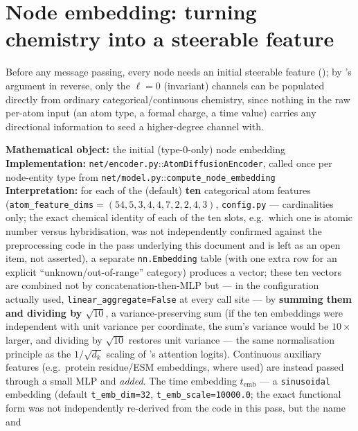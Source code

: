 \documentclass[11pt,a4paper]{report}
\theoremstyle{definition}
\theoremstyle{remark}
\newcommand{\file}[1]{\texttt{#1}}
\newcommand{\pyfunc}[1]{\texttt{#1}}
\begin{document}
\section{Node embedding: turning chemistry into a steerable feature}
\label{sec:node-embedding}

Before any message passing, every node needs an initial steerable feature
(); by 's
argument in reverse, only the $\ell=0$ (invariant) channels can be
populated directly from ordinary categorical/continuous chemistry, since
nothing in the raw per-atom input (an atom type, a formal charge, a time
value) carries any directional information to seed a higher-degree channel
with.

\begin{codebox}
\textbf{Mathematical object:} the initial (type-$0$-only) node embedding \\
\textbf{Implementation:} \file{net/encoder.py}::\pyfunc{AtomDiffusionEncoder},
called once per node-entity type from \file{net/model.py}::\pyfunc{compute\_node\_embedding} \\
\textbf{Interpretation:} for each of the (default) \textbf{ten} categorical
atom features (\texttt{atom\_feature\_dims}$=(54,5,3,4,4,7,2,2,4,3)$,
\file{config.py} --- cardinalities only; the exact chemical identity of
each of the ten slots, e.g.\ which one is atomic number versus
hybridisation, was not independently confirmed against the preprocessing
code in the pass underlying this document and is left as an open item, not
asserted), a separate \pyfunc{nn.Embedding} table (with one extra row for
an explicit ``unknown/out-of-range'' category) produces a vector; these ten
vectors are combined not by concatenation-then-MLP but --- in the
configuration actually used, \texttt{linear\_aggregate=False} at every call
site --- by \textbf{summing them and dividing by $\sqrt{10}$}, a
variance-preserving sum (if the ten embeddings were independent with unit
variance per coordinate, the sum's variance would be $10\times$ larger, and
dividing by $\sqrt{10}$ restores unit variance --- the same normalisation
principle as the $1/\sqrt{d_k}$ scaling of 's
attention logits). Continuous auxiliary features (e.g.\ protein residue/ESM
embeddings, where used) are instead passed through a small MLP and
\emph{added}. The time embedding $t_{\mathrm{emb}}$ --- a
\texttt{sinusoidal} embedding (default \texttt{t\_emb\_dim=32},
\texttt{t\_emb\_scale=10000.0}; the exact functional form was not
independently re-derived from the code in this pass, but the name and

\end{codebox}
\end{document}
